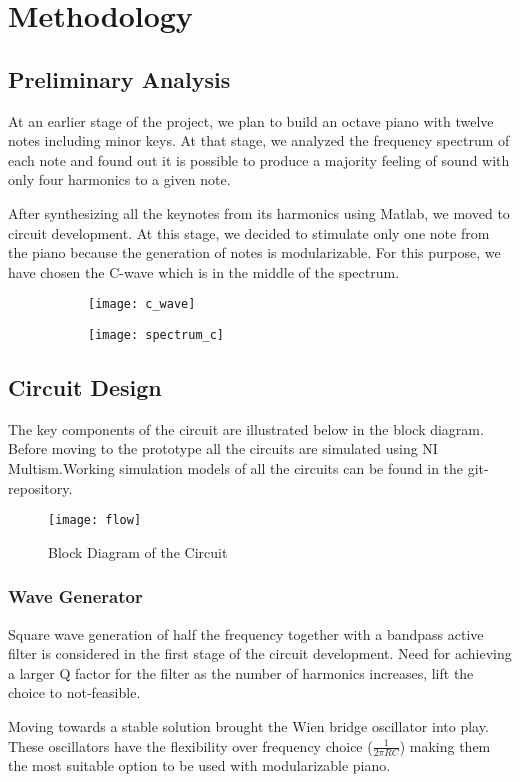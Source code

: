 \section{Methodology}
\subsection{Preliminary Analysis}
At an earlier stage of the project, we plan to build an octave piano with twelve notes including minor keys. At that stage, we analyzed the frequency spectrum of each note and found out it is possible to produce a majority feeling of sound with only four harmonics to a given note.
\par
After synthesizing all the keynotes from its harmonics using Matlab, we moved to circuit development. At this stage, we decided to stimulate only one note from the piano because the generation of notes is modularizable. For this purpose, we have chosen the C-wave which is in the middle of the spectrum.
\begin{figure}[h]
    \begin{subfigure}{.45\columnwidth}
        \centering
        \texttt{[image: c\_wave]}
    \end{subfigure}
    \begin{subfigure}{.45\columnwidth}
        \centering
        \texttt{[image: spectrum\_c]}
    \end{subfigure}

\end{figure}
\subsection{Circuit Design}
The key components of the circuit are illustrated below in the block diagram. Before moving to the prototype all the circuits are simulated using NI Multism.Working simulation models of all the circuits can be found in the git-repository.
\begin{figure}[h]
    \begin{center}
        \texttt{[image: flow]}
        \caption*{Block Diagram of the Circuit}
    \end{center}
\end{figure}
\subsubsection{Wave Generator}
Square wave generation of half the frequency together with a bandpass active filter is considered in the first stage of the circuit development. Need for achieving a larger Q factor for the filter as the number of harmonics increases, lift the choice to not-feasible.
\par
Moving towards a stable solution brought the Wien bridge oscillator into play. These oscillators have the flexibility over frequency choice ($\frac{1}{2\pi RC}$) making them the most suitable option to be used with modularizable piano.
